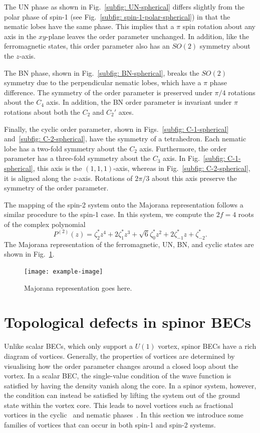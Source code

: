 The UN phase as shown in Fig.~\ref{subfig: UN-spherical} differs slightly from
the polar phase of spin-1 (see Fig.~\ref{subfig: spin-1-polar-spherical}) in
that the nematic lobes have the same phase.
This implies that a \(\pi \) spin rotation about any axis in the \(xy\)-plane
leaves the order parameter unchanged.
In addition, like the ferromagnetic states, this order parameter also has an
\(SO(2)\) symmetry about the \(z\)-axis.

The BN phase, shown in Fig.~\ref{subfig: BN-spherical}, breaks the \(SO(2)\)
symmetry due to the perpendicular nematic lobes, which have a \(\pi \) phase
difference.
The symmetry of the order parameter is preserved under \(\pi/4\) rotations
about the \(C_4\) axis.
In addition, the BN order parameter is invariant under \(\pi \) rotations about
both the \(C_2\) and \(C_2'\) axes.

Finally, the cyclic order parameter, shown in Figs.~\ref{subfig: C-1-spherical}
and~\ref{subfig: C-2-spherical}, have the symmetry of a tetrahedron.
Each nematic lobe has a two-fold symmetry about the \(C_2\) axis.
Furthermore, the order parameter has a three-fold symmetry about the \(C_3\)
axis.
In Fig.~\ref{subfig: C-1-spherical}, this axis is the \((1, 1, 1)\)-axis,
whereas in Fig.~\ref{subfig: C-2-spherical}, it is aligned along the \(z\)-axis.
Rotations of \(2\pi/3\) about this axis preserve the symmetry of the order
parameter.

The mapping of the spin-2 system onto the Majorana representation follows a
similar procedure to the spin-1 case.
In this system, we compute the \(2f=4\) roots of the complex polynomial
\begin{equation}
    P^{(2)}(z) = \zeta_2^*z^4 + 2\zeta_1^*z^3 + \sqrt{6}\zeta_0^*z^2
    + 2\zeta_{-1}^*z + \zeta_{-2}^*.
\end{equation}
The Majorana representation of the ferromagnetic, UN, BN, and cyclic states
are shown in Fig.~\ref{fig: spin-2-Majorana}.
\begin{figure}
    \centering
    \texttt{[image: example-image]}
    \caption[Majorana representation of spin-2 ground states]
    {\label{fig: spin-2-Majorana}Majorana representation goes here.}
\end{figure}

\section{Topological defects in spinor BECs}
Unlike scalar BECs, which only support a \(U(1)\) vortex, spinor BECs have a
rich diagram of vortices.
Generally, the properties of vortices are determined by visualising how the
order parameter changes around a closed loop about the vortex.
In a scalar BEC, the single-value condition of the wave function is satisfied
by having the density vanish along the core.
In a spinor system, however, the condition can instead be satisfied by lifting
the system out of the ground state within the vortex core.
This leads to novel vortices such as fractional vortices in the
cyclic~\cite{Semenoff2007,Huhtamaki2009} and nematic
phases~\cite{Leonhardt2000, Seo2015}.
In this section we introduce some families of vortices that can occur
in both spin-1 and spin-2 systems.

